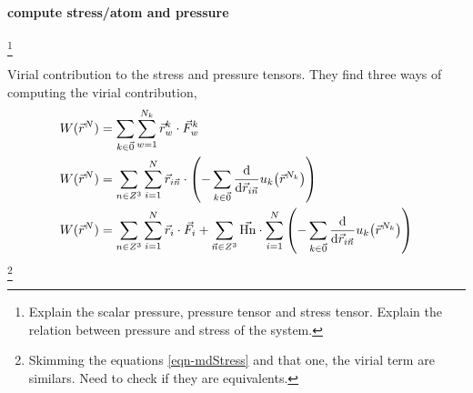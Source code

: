 \documentclass[../../main-notes.tex]{subfiles}
\begin{document}
\paragraph{compute stress/atom and pressure}\footnote{Explain the scalar pressure, pressure tensor and stress tensor. Explain the relation between pressure and stress of the system.}

Virial contribution to the stress and pressure tensors\citep{Thompson_Plimpton_Mattson_2009}.
They find three ways of computing the virial contribution,
\begin{align}
    W(\vec{r}^N) &= \sum_{k\in\vec{0}}\sum_{w=1}^{N_k} \vec{r}^k_{w}\cdot\vec{F}^k_{w} \\
    W(\vec{r}^N) &= \sum_{n\in Z^3}\sum_{i=1}^N \vec{r}_{i\vec{n}}\cdot\left(
    -\sum_{k\in\vec{0}}\dv{\vec{r}_{i\vec{n}}}u_k\qty(\vec{r}^{N_k})\right) \\
        W(\vec{r}^N) &= \sum_{n\in Z^3}\sum_{i=1}^N \vec{r}_{i}\cdot\vec{F}_i 
    +\sum_{\vec{n}\in Z^3}\vec{\mathrm{Hn}}\cdot\sum_{i=1}^N\left(
    -\sum_{k\in\vec{0}}\dv{\vec{r}_{i\vec{n}}}u_k\qty(\vec{r}^{N_k})\right)
\end{align}
\footnote{Skimming the equations \eqref{eqn-mdStress} and that one, the virial term are similars. Need to check if they are equivalents. }
\end{document}

